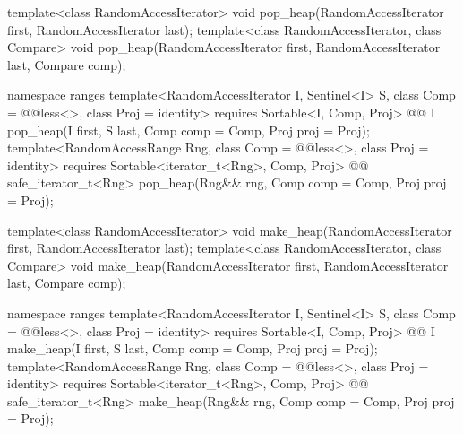 \begin{codeblock}
  template<class RandomAccessIterator>
    void pop_heap(RandomAccessIterator first, RandomAccessIterator last);
  template<class RandomAccessIterator, class Compare>
    void pop_heap(RandomAccessIterator first, RandomAccessIterator last,
                  Compare comp);
\end{codeblock}\begin{addedblock}\begin{codeblock}
  namespace ranges {
    template<RandomAccessIterator I, Sentinel<I> S, class Comp = @@less<>,
        class Proj = identity>
      requires Sortable<I, Comp, Proj>
      @@ I
        pop_heap(I first, S last, Comp comp = Comp{}, Proj proj = Proj{});
    template<RandomAccessRange Rng, class Comp = @@less<>, class Proj = identity>
      requires Sortable<iterator_t<Rng>, Comp, Proj>
      @@ safe_iterator_t<Rng>
        pop_heap(Rng&& rng, Comp comp = Comp{}, Proj proj = Proj{});
  }
\end{codeblock}\end{addedblock}\begin{codeblock}

  template<class RandomAccessIterator>
    void make_heap(RandomAccessIterator first, RandomAccessIterator last);
  template<class RandomAccessIterator, class Compare>
    void make_heap(RandomAccessIterator first, RandomAccessIterator last,
                   Compare comp);
\end{codeblock}\begin{addedblock}\begin{codeblock}
  namespace ranges {
    template<RandomAccessIterator I, Sentinel<I> S, class Comp = @@less<>,
        class Proj = identity>
      requires Sortable<I, Comp, Proj>
      @@ I
        make_heap(I first, S last, Comp comp = Comp{}, Proj proj = Proj{});
    template<RandomAccessRange Rng, class Comp = @@less<>, class Proj = identity>
      requires Sortable<iterator_t<Rng>, Comp, Proj>
      @@ safe_iterator_t<Rng>
        make_heap(Rng&& rng, Comp comp = Comp{}, Proj proj = Proj{});
  }
\end{codeblock}\end{addedblock}\begin{codeblock}


\end{codeblock}
